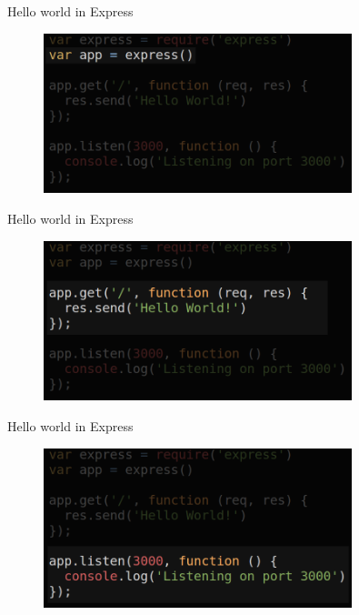 \documentclass{beamer}
\begin{document}
\begin{frame}{Hello world in Express}

\begin{figure}[h]
\includegraphics[width=0.8\textwidth]{express2}
\end{figure}


\end{frame}

\begin{frame}{Hello world in Express}

\begin{figure}[h]
\includegraphics[width=0.8\textwidth]{express3}
\end{figure}


\end{frame}

\begin{frame}{Hello world in Express}

\begin{figure}[h]
\includegraphics[width=0.8\textwidth]{express4}
\end{figure}


\end{frame}
\end{document}
